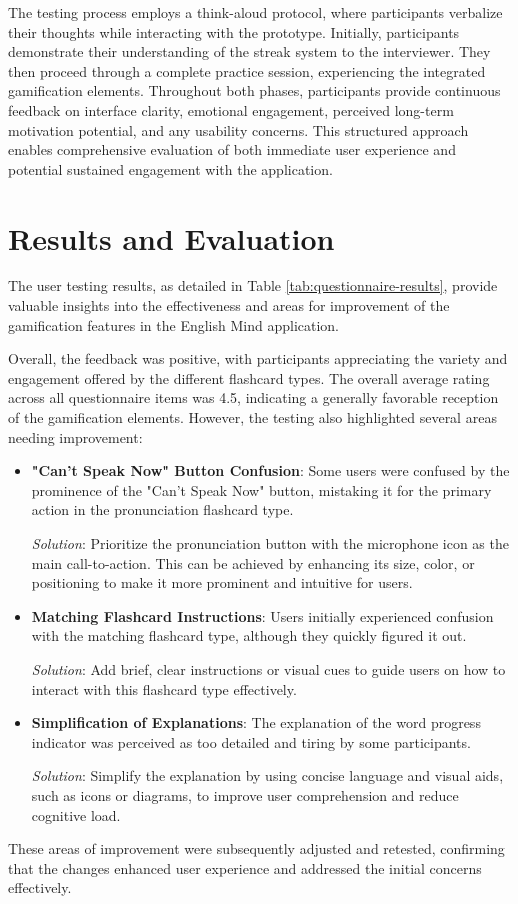 The testing process employs a think-aloud protocol, where participants verbalize their thoughts while interacting with the prototype. Initially, participants demonstrate their understanding of the streak system to the interviewer. They then proceed through a complete practice session, experiencing the integrated gamification elements. Throughout both phases, participants provide continuous feedback on interface clarity, emotional engagement, perceived long-term motivation potential, and any usability concerns. This structured approach enables comprehensive evaluation of both immediate user experience and potential sustained engagement with the application.

\newpage

\section{Results and Evaluation}

The user testing results, as detailed in Table \ref{tab:questionnaire-results}, provide valuable insights into the effectiveness and areas for improvement of the gamification features in the English Mind application.

Overall, the feedback was positive, with participants appreciating the variety and engagement offered by the different flashcard types. The overall average rating across all questionnaire items was 4.5, indicating a generally favorable reception of the gamification elements. However, the testing also highlighted several areas needing improvement:

\begin{itemize}
    \item \textbf{"Can't Speak Now" Button Confusion}: Some users were confused by the prominence of the "Can't Speak Now" button, mistaking it for the primary action in the pronunciation flashcard type.
    
    \textit{Solution}: Prioritize the pronunciation button with the microphone icon as the main call-to-action. This can be achieved by enhancing its size, color, or positioning to make it more prominent and intuitive for users.
    
    \item \textbf{Matching Flashcard Instructions}: Users initially experienced confusion with the matching flashcard type, although they quickly figured it out.
    
    \textit{Solution}: Add brief, clear instructions or visual cues to guide users on how to interact with this flashcard type effectively.
    
    \item \textbf{Simplification of Explanations}: The explanation of the word progress indicator was perceived as too detailed and tiring by some participants.
    
    \textit{Solution}: Simplify the explanation by using concise language and visual aids, such as icons or diagrams, to improve user comprehension and reduce cognitive load.
\end{itemize}

These areas of improvement were subsequently adjusted and retested, confirming that the changes enhanced user experience and addressed the initial concerns effectively.

